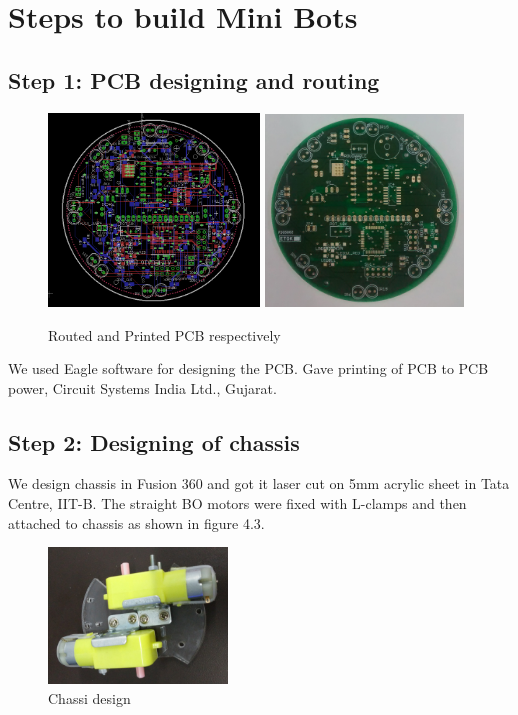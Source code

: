 \documentclass[a4paper,12pt,oneside]{book}
\begin{document}
\section{Steps to build Mini Bots}
\subsection*{Step 1: PCB designing and routing}
\begin{figure}[h!]
	\includegraphics[width=0.5\textwidth]{./PCB_layout}
	\includegraphics[width=0.47\textwidth]{./Pictures/PCB_front}		
	\caption{Routed and Printed PCB respectively}
\end{figure}	
We used Eagle software for designing the PCB. Gave printing of PCB to PCB power, Circuit Systems India Ltd., Gujarat.
\subsection*{Step 2: Designing of chassis}
We design chassis in Fusion 360 and got it laser cut on 5mm acrylic sheet in Tata Centre, IIT-B. The straight BO motors were fixed with L-clamps and then attached to chassis as shown in figure 4.3. 
\begin{figure}[h!]
	\centering\includegraphics[width=180px]{./Pictures/Chassis_Design}		
		\caption{Chassi design}
\end{figure}	
       
\end{document}
